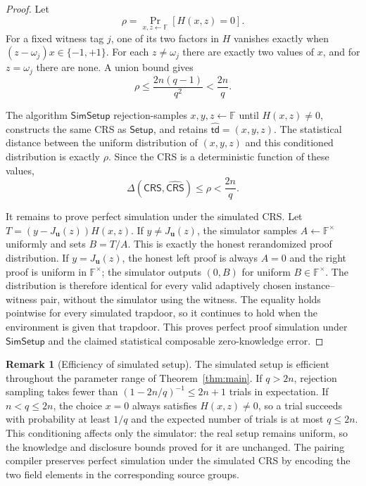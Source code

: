 \documentclass[11pt]{article}
\theoremstyle{definition}
\newtheorem{remark}[theorem]{Remark}
\newcommand{\F}{\mathbb F}
\newcommand{\Setup}{\mathsf{Setup}}
\newcommand{\SimSetup}{\mathsf{SimSetup}}
\newcommand{\td}{\mathsf{td}}
\begin{document}
\begin{proof}
Let
\begin{equation}
  \rho=\Pr_{x,z\leftarrow\F}[H(x,z)=0].
  \label{eq:zk-bad-event}
\end{equation}
For a fixed witness tag $j$, one of its two factors in $H$ vanishes exactly when
$(z-\omega_j)x\in\{-1,+1\}$.  For each $z\ne\omega_j$ there are exactly two
values of $x$, and for $z=\omega_j$ there are none.  A union bound gives
\begin{equation}
  \rho\le\frac{2n(q-1)}{q^2}<\frac{2n}{q}.
  \label{eq:zk-bad-bound}
\end{equation}

The algorithm $\SimSetup$ rejection-samples $x,y,z\leftarrow\F$ until
$H(x,z)\ne0$, constructs the same CRS as $\Setup$, and retains
$\widehat{\td}=(x,y,z)$.  The statistical distance between the uniform
distribution of $(x,y,z)$ and this conditioned distribution is exactly
$\rho$.  Since the CRS is a deterministic function of these values,
\[
  \Delta(\mathsf{CRS},\widehat{\mathsf{CRS}})
  \le \rho<\frac{2n}{q}.
\]

It remains to prove perfect simulation under the simulated CRS.  Let
 $T=(y-J_{\mathbf u}(z))H(x,z)$.  If $y\ne J_{\mathbf u}(z)$, the simulator samples
$A\leftarrow\F^\times$ uniformly and sets $B=T/A$.  This is exactly the honest
rerandomized proof distribution.  If $y=J_{\mathbf u}(z)$, the honest left proof is always $A=0$ and the right proof is uniform in $\F^\times$; the simulator outputs $(0,B)$
for uniform $B\in\F^\times$.  The distribution is therefore identical for every
valid adaptively chosen instance--witness pair, without the simulator using
the witness.  The equality holds pointwise for every simulated trapdoor, so it
continues to hold when the environment is given that trapdoor.  This proves
perfect proof simulation under $\SimSetup$ and the claimed statistical
composable zero-knowledge error.
\end{proof}

\begin{remark}[Efficiency of simulated setup]
The simulated setup is efficient throughout the parameter range of
Theorem~\ref{thm:main}.  If $q>2n$, rejection sampling takes fewer than
$(1-2n/q)^{-1}\le 2n+1$ trials in expectation.  If $n<q\le2n$, the choice
$x=0$ always satisfies $H(x,z)\ne0$, so a trial succeeds with probability at
least $1/q$ and the expected number of trials is at most $q\le2n$.  This
conditioning affects only the simulator: the real setup remains uniform, so
the knowledge and disclosure bounds proved for it are unchanged.  The pairing
compiler preserves perfect simulation under the simulated CRS by encoding the
two field elements in the corresponding source groups.
\end{remark}
\end{document}
